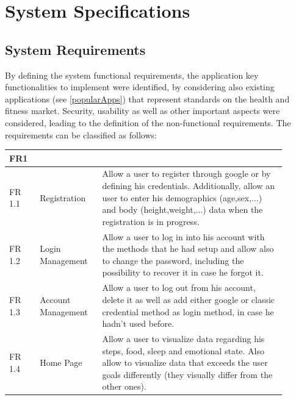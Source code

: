 \newpage
\section{System Specifications}
\subsection{System Requirements}
By defining the system functional requirements, the application key functionalities to implement were identified, by considering also existing applications (see \cref{popularApps}) that represent standards on the health and fitness market. Security, usability as well as other important aspects were considered, leading to the definition of the non-functional requirements. The requirements can be classified as follows:
\vspace{5ex}
\begin{table}[h!]
    \setstretch{\myspacing}
    \centering
    \begin{tabular}{|>{\raggedright\arraybackslash}p{0.1\linewidth}|>{\raggedright\arraybackslash}p{0.2\linewidth}|>{\raggedright\arraybackslash}p{0.6\linewidth}|}
        \hline
        \textbf{FR1} & \multicolumn{2}{>{\centering\arraybackslash}p{0.7\linewidth}|}{\textbf{User Management}} \\
        \hline
        FR 1.1 & Registration & Allow a user to register through google or by defining his credentials. Additionally, allow an user to enter his demographics (age,sex,...) and body (height,weight,...) data when the registration is in progress. \\
        \hline
        FR 1.2 & Login Management & Allow a user to log in into his account with the methods that he had setup and allow also to change the password, including the possibility to recover it in case he forgot it.  \\
        \hline
        FR 1.3 & Account Management & Allow a user to log out from his account, delete it as well as add either google or classic credential method as login method, in case he hadn't used before.  \\
        \hline
        FR 1.4 & Home Page & Allow a user to visualize data regarding his steps, food, sleep and emotional state. Also allow to visualize data that exceeds the user goals differently (they visually differ from the other ones). \\
        \hline
    \end{tabular}
\end{table}


